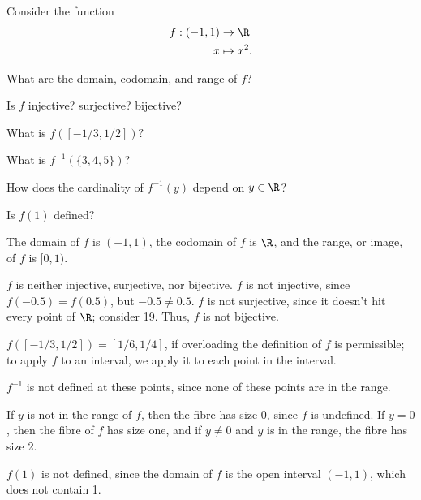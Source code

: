 \documentclass{assignment}
\begin{document}
\begin{question}[4]
  Consider the function 
  \begin{align*}
    f: (-1, 1) &\to \R \\
             x &\mapsto x^2.
  \end{align*}
  \begin{qparts}
    \item What are the domain, codomain, and range of $f$? 
    \item Is $f$ injective? surjective? bijective?
    \item What is $f([-1/3, 1/2])?$
    \item What is $f^{-1}(\{3,4,5\})$?
    \item How does the cardinality of $f^{-1}(y)$ depend on $y\in\R$?
    \item Is $f(1)$ defined?
  \end{qparts}
\end{question}
\begin{qparts}
  \item The domain of $f$ is $(-1, 1)$, the codomain of $f$ is $\R$, and the range, or image, of $f$
        is $[0, 1)$.
  \item $f$ is neither injective, surjective, nor bijective. $f$ is not injective, since $f(-0.5) =
        f(0.5)$, but $-0.5 \neq 0.5$. $f$ is not surjective, since it doesn't hit every point of $\R$;
        consider 19. Thus, $f$ is not bijective.
  \item $f([-1/3, 1/2]) = [1/6, 1/4]$, if overloading the definition of $f$ is permissible; to apply
        $f$ to an interval, we apply it to each point in the interval.
  \item $f^{-1}$ is not defined at these points, since none of these points are in the range.
  \item If $y$ is not in the range of $f$, then the fibre has size 0, since $f$ is undefined. If $y
        = 0$, then the fibre of $f$ has size one, and if $y \neq 0$ and $y$ is in the range, the fibre
        has size 2.
  \item $f(1)$ is not defined, since the domain of $f$ is the open interval $(-1, 1)$, which does not
        contain 1.
\end{qparts}
\end{document}
